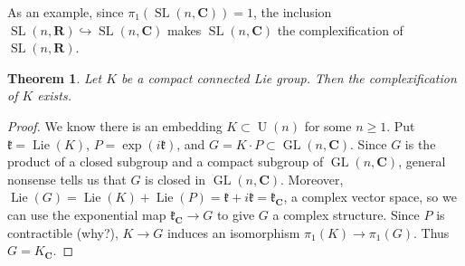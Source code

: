 \documentclass{article}
\DeclareMathOperator{\GL}{GL}
\DeclareMathOperator{\Lie}{Lie}
\DeclareMathOperator{\SL}{SL}
\DeclareMathOperator{\U}{U}
\newcommand{\bC}{{\mathbf C}}
\newcommand{\bR}{{\mathbf R}}
\newcommand{\fk}{{\mathfrak k}}
\newtheorem{theorem}{Theorem}
\theoremstyle{definition}
\begin{document}
As an example, since $\pi_1(\SL(n,\bC))=1$, the inclusion 
$\SL(n,\bR)\hookrightarrow \SL(n,\bC)$ makes $\SL(n,\bC)$ the complexification 
of $\SL(n,\bR)$. 

\begin{theorem}
Let $K$ be a compact connected Lie group. Then the complexification of $K$ 
exists. 
\end{theorem}
\begin{proof}
We know there is an embedding $K\subset \U(n)$ for some $n\geqslant 1$. Put 
$\fk=\Lie(K)$, $P=\exp(i \fk)$, and $G=K\cdot P\subset \GL(n,\bC)$. Since 
$G$ is the product of a closed subgroup and a compact subgroup of $\GL(n,\bC)$, 
general nonsense tells us that $G$ is closed in $\GL(n,\bC)$. Moreover, 
$\Lie(G)=\Lie(K)+\Lie(P) = \fk+i\fk = \fk_\bC$, a complex vector space, so we 
can use the exponential map $\fk_\bC \to G$ to give $G$ a complex structure. 
Since $P$ is contractible (why?), $K\to G$ induces an isomorphism 
$\pi_1(K)\to \pi_1(G)$. Thus $G=K_\bC$. 
\end{proof}
\end{document}

